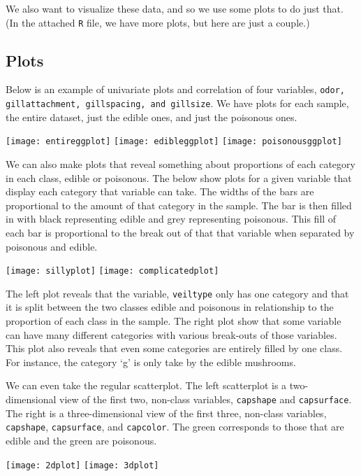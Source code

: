 \documentclass{article}
\begin{document}
We also want to visualize these data, and so we use some plots to do just that. (In the attached \texttt{R} file, we have more plots, but here are just a couple.)

\subsection{Plots}
Below is an example of univariate plots and correlation of four variables, \texttt{odor, gillattachment, gillspacing, and gillsize}. We have plots for each sample, the entire dataset, just the edible ones, and just the poisonous ones.

\noindent
\texttt{[image: entireggplot]}
\texttt{[image: edibleggplot]}
\texttt{[image: poisonousggplot]}

We can also make plots that reveal something about proportions of each category in each class, edible or poisonous. The below show plots for a given variable that display each category that variable can take. The widths of the bars are proportional to the amount of that category in the sample. The bar is then filled in with black representing edible and grey representing poisonous. This fill of each bar is proportional to the break out of that that variable when separated by poisonous and edible. 

\noindent
\begin{center}
\quad\texttt{[image: sillyplot]}\quad
\texttt{[image: complicatedplot]}
\end{center}

The left plot reveals that the variable, \texttt{veiltype} only has one category and that it is split between the two classes edible and poisonous in relationship to the proportion of each class in the sample. The right plot show that some variable can have many different categories with various break-outs of those variables. This plot also reveals that even some categories are entirely filled by one class. For instance, the category `g' is only take by the edible mushrooms.

We can even take the regular scatterplot. The left scatterplot is a two-dimensional view of the first two, non-class variables, \texttt{capshape} and \texttt{capsurface}. The right is a three-dimensional view of the first three, non-class variables, \texttt{capshape}, \texttt{capsurface}, and \texttt{capcolor}. The green corresponds to those that are edible and the green are poisonous.


\begin{center}
\quad\texttt{[image: 2dplot]}\quad
\texttt{[image: 3dplot]}
\end{center}
\end{document}
